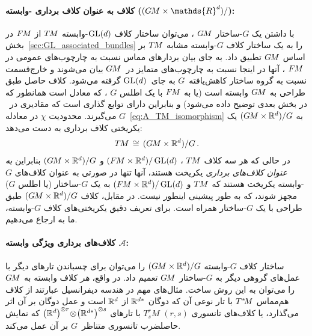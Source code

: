 \paragraph{کلاف  به عنوان کلاف برداری -وابسته ($(\GM\times \mathds{R}^d)/$):}

با داشتن یک $G$-ساختار $G\mkern-1.4muM$ ، می‌توان ساختار کلاف $\operatorname{GL}(d)$-وابسته $T\mkern-1.5muM$ از $F\mkern-1.5muM$ در بخش~\ref{sec:GL_associated_bundles} را به یک ساختار کلاف $G$-وابسته مشابه $T\mkern-1.5muM$ بر اساس $G\mkern-1.4muM$ تطبیق داد.
به جای بیان بردارهای مماس نسبت به چارچوب‌های عمومی در $F\mkern-1.5muM$ ، آنها در اینجا نسبت به چارچوب‌های متمایز در~$G\mkern-1.4muM$ بیان می‌شوند و خارج‌قسمت نسبت به گروه ساختار کاهش‌یافته~$G$ به جای~$\operatorname{GL}(d)$ گرفته می‌شود.
کلاف حاصل طبق طراحی به $G\mkern-1.4muM$ وابسته است (یا به $F\mkern-1.5muM$ با یک اطلس $G$ ، که معادل است همانطور که در بخش بعدی توضیح داده می‌شود) و بنابراین دارای توابع گذاری است که مقادیری در~$G$ می‌گیرند.
محدودیت $\chi$ در معادله~\eqref{eq:A_TM_isomorphism} به $(G\mkern-1.4muM\times\mathbb{R}^d)/G$ یک یکریختی کلاف برداری به دست می‌دهد:
\begin{align}
	T\mkern-1.5muM\, \cong\, (G\mkern-1.4muM\times\mathbb{R}^d)/G \,.
\end{align}
در حالی که هر سه کلاف $T\mkern-1.5muM$ ، $(F\mkern-1.5muM\times\mathbb{R}^d)/\operatorname{GL}(d)$ و $(G\mkern-1.4muM\times\mathbb{R}^d)/G$ بنابراین \emph{به عنوان کلاف‌های برداری} یکریخت هستند، آنها تنها در صورتی به عنوان کلاف‌های $G$-وابسته یکریخت هستند که $T\mkern-1.5muM$ و $(F\mkern-1.5muM\times\mathbb{R}^d)/\operatorname{GL}(d)$ به یک $G$-ساختار (یا اطلس $G$) مجهز شوند، که به طور پیشینی اینطور نیست.
در مقابل، کلاف $(G\mkern-1.4muM\times\mathbb{R}^d)/G$ طبق طراحی با یک $G$-ساختار همراه است.
برای تعریف دقیق یکریختی‌های کلاف $G$-وابسته، ما به \cite{schullerGeometricalAnatomy2016} ارجاع می‌دهیم.


\paragraph{کلاف‌های برداری ویژگی وابسته $\mathcal{A}$:}
ساختار کلاف $G$-وابسته $(G\mkern-1.4muM\times\mathbb{R}^d)/G$ را می‌توان برای چسباندن تارهای دیگر با عمل‌های گروهی دیگر به $G$-ساختار $G\mkern-1.4muM$ تعمیم داد.
در واقع، \emph{هر} کلاف وابسته به $G\mkern-1.4muM$ را می‌توان به این روش ساخت.
مثال‌های مهم در هندسه دیفرانسیل عبارتند از کلاف هم‌مماس $T^{\mkern0.5mu *}\mkern-3.5muM$ با تار نوعی آن که دوگان $\mathbb{R}^{d*}$ از $\mathbb{R}^d$ است و عمل دوگان بر آن اثر می‌گذارد، یا کلاف‌های تانسوری $(r,s)$ $T^r_s\!M$ با تارهای $\big(\mathbb{R}^d\big)^{\otimes r}\! \otimes\! \big(\mathbb{R}^{d*}\big)^{\otimes s}$ که نمایش حاصلضرب تانسوری متناظر~$G$ بر آن عمل می‌کند.

